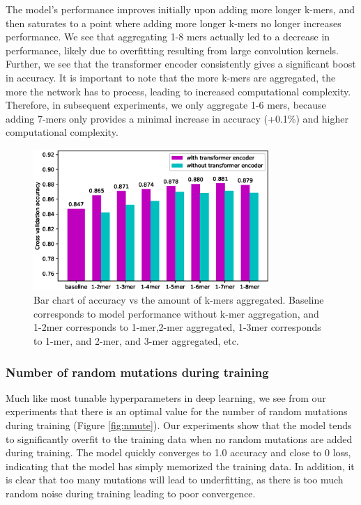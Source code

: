 \documentclass{article}
\begin{document}
The model's performance improves initially upon adding more longer k-mers, and then saturates to a point where adding more longer k-mers no longer increases performance. We see that aggregating 1-8 mers actually led to a decrease in performance, likely due to overfitting resulting from large convolution kernels. Further, we see that the transformer encoder consistently gives a significant boost in accuracy. It is important to note that the more k-mers are aggregated, the more the network has to process, leading to increased computational complexity.  Therefore, in subsequent experiments, we only aggregate 1-6 mers, because adding 7-mers only provides a minimal increase in accuracy (+0.1\%) and higher computational complexity.
\begin{figure}[H]
\center
\includegraphics[width=0.8\textwidth]{kmer_test.eps}
%
\caption{Bar chart of accuracy vs the amount of k-mers aggregated. Baseline corresponds to model performance without k-mer aggregation, and 1-2mer corresponds to 1-mer,2-mer aggregated, 1-3mer corresponds to 1-mer, and 2-mer, and 3-mer aggregated, etc.}
\label{fig:kmers}
\end{figure}



\subsubsection{Number of random mutations during training}

Much like most tunable hyperparameters in deep learning, we see from our experiments that there is an optimal value for the number of random mutations during training (Figure \ref{fig:nmute}). Our experiments show that the model tends to significantly overfit to the training data when no random mutations are added during training. The model quickly converges to 1.0 accuracy and close to 0 loss, indicating that the model has simply memorized the training data. In addition, it is clear that too many mutations will lead to underfitting, as there is too much random noise during training leading to poor convergence. 
\end{document}
